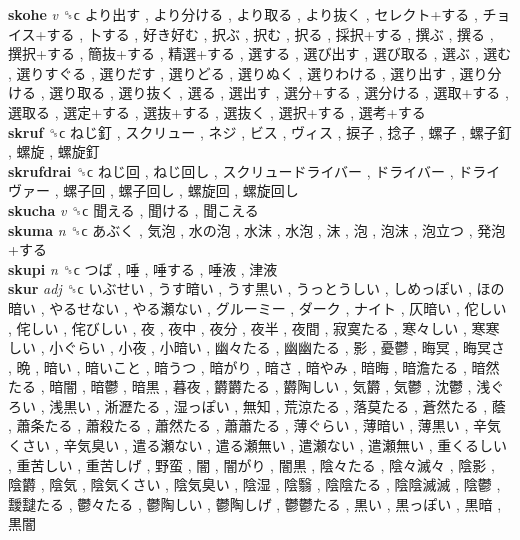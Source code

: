 \textbf{skohe} \emph{v}  ␝ϲ   より出す ,  より分ける ,  より取る ,  より抜く ,  セレクト+する ,  チョイス+する ,  卜する ,  好き好む ,  択ぶ ,  択む ,  択る ,  採択+する ,  撰ぶ ,  撰る ,  撰択+する ,  簡抜+する ,  精選+する ,  選する ,  選び出す ,  選び取る ,  選ぶ ,  選む ,  選りすぐる ,  選りだす ,  選りどる ,  選りぬく ,  選りわける ,  選り出す ,  選り分ける ,  選り取る ,  選り抜く ,  選る ,  選出す ,  選分+する ,  選分ける ,  選取+する ,  選取る ,  選定+する ,  選抜+する ,  選抜く ,  選択+する ,  選考+する   \\
\textbf{skruf} ␝ϲ   ねじ釘 ,  スクリュー ,  ネジ ,  ビス ,  ヴィス ,  捩子 ,  捻子 ,  螺子 ,  螺子釘 ,  螺旋 ,  螺旋釘   \\
\textbf{skrufdrai} ␝ϲ   ねじ回 ,  ねじ回し ,  スクリュードライバー ,  ドライバー ,  ドライヴァー ,  螺子回 ,  螺子回し ,  螺旋回 ,  螺旋回し   \\
\textbf{skucha} \emph{v}  ␝ϲ   聞える ,  聞ける ,  聞こえる   \\
\textbf{skuma} \emph{n}  ␝ϲ   あぶく ,  気泡 ,  水の泡 ,  水沫 ,  水泡 ,  沫 ,  泡 ,  泡沫 ,  泡立つ ,  発泡+する   \\
\textbf{skupi} \emph{n}  ␝ϲ   つば ,  唾 ,  唾する ,  唾液 ,  津液   \\
\textbf{skur} \emph{adj}  ␝ϲ   いぶせい ,  うす暗い ,  うす黒い ,  うっとうしい ,  しめっぽい ,  ほの暗い ,  やるせない ,  やる瀬ない ,  グルーミー ,  ダーク ,  ナイト ,  仄暗い ,  佗しい ,  侘しい ,  侘びしい ,  夜 ,  夜中 ,  夜分 ,  夜半 ,  夜間 ,  寂寞たる ,  寒々しい ,  寒寒しい ,  小ぐらい ,  小夜 ,  小暗い ,  幽々たる ,  幽幽たる ,  影 ,  憂鬱 ,  晦冥 ,  晦冥さ ,  晩 ,  暗い ,  暗いこと ,  暗うつ ,  暗がり ,  暗さ ,  暗やみ ,  暗晦 ,  暗澹たる ,  暗然たる ,  暗闇 ,  暗鬱 ,  暗黒 ,  暮夜 ,  欝欝たる ,  欝陶しい ,  気欝 ,  気鬱 ,  沈鬱 ,  浅ぐろい ,  浅黒い ,  淅瀝たる ,  湿っぽい ,  無知 ,  荒涼たる ,  落莫たる ,  蒼然たる ,  蔭 ,  蕭条たる ,  蕭殺たる ,  蕭然たる ,  蕭蕭たる ,  薄ぐらい ,  薄暗い ,  薄黒い ,  辛気くさい ,  辛気臭い ,  遣る瀬ない ,  遣る瀬無い ,  遣瀬ない ,  遣瀬無い ,  重くるしい ,  重苦しい ,  重苦しげ ,  野蛮 ,  闇 ,  闇がり ,  闇黒 ,  陰々たる ,  陰々滅々 ,  陰影 ,  陰欝 ,  陰気 ,  陰気くさい ,  陰気臭い ,  陰湿 ,  陰翳 ,  陰陰たる ,  陰陰滅滅 ,  陰鬱 ,  靉靆たる ,  鬱々たる ,  鬱陶しい ,  鬱陶しげ ,  鬱鬱たる ,  黒い ,  黒っぽい ,  黒暗 ,  黒闇   \\
